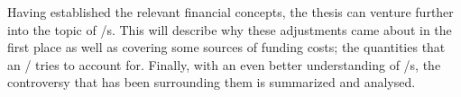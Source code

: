 \documentclass[main.tex]{subfiles}
\begin{document}
    Having established the relevant financial concepts, 
    the thesis can venture further into the topic of \FVA/s.
    This  will describe why these adjustments came about in the first place
    as well as covering some sources of funding costs; 
    the quantities that an \FVA/ tries to account for.
    Finally, with an even better understanding of \FVA/s, 
    the controversy that has been surrounding them is summarized and analysed. 
    
\end{document}
